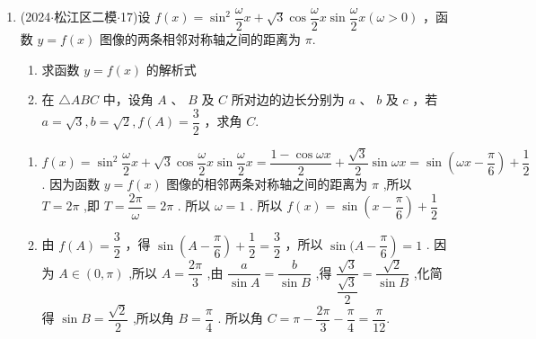 \begin{enumerate}
    \item (2024$\cdot$松江区二模$\cdot$17)设 $f\left( x\right)  = {\sin }^{2}\dfrac{\omega }{2}x + \sqrt{3}\cos \dfrac{\omega }{2}x\sin \dfrac{\omega }{2}x\left( {\omega  > 0}\right)$ ，函数 $y = f\left( x\right)$ 图像的两条相邻对称轴之间的距离为 $\pi$.
    \begin{enumerate}
        \item 求函数 $y = f\left( x\right)$ 的解析式
        \item 在 $\bigtriangleup  {ABC}$ 中，设角 $A$ 、 $B$ 及 $C$ 所对边的边长分别为 $a$ 、 $b$ 及 $c$ ，若 $a = \sqrt{3},b = \sqrt{2},f\left( A\right)  = \dfrac{3}{2}$ ，求角 $C$.
    \end{enumerate}
    \begin{jieda}
        \begin{enumerate}
            \item $f\left( x\right)  = {\sin }^{2}\dfrac{\omega }{2}x + \sqrt{3}\cos \dfrac{\omega }{2}x\sin \dfrac{\omega }{2}x = \dfrac{1 - \cos {\omega x}}{2} +  \dfrac{\sqrt{3}}{2}\sin {\omega x} = \sin \left( {{\omega x} - \dfrac{\pi }{6}}\right)  + \dfrac{1}{2}$ . 因为函数 $y = f\left( x\right)$ 图像的相邻两条对称轴之间的距离为 $\pi$ ,所以 $T = {2\pi }$ ,即 $T = \dfrac{2\pi }{\omega } = {2\pi }$ . 所以 $\omega  = 1$ . 所以 $f\left( x\right)  = \sin \left( {x - \dfrac{\pi }{6}}\right)  + \dfrac{1}{2}$
            \item 由 $f\left( A\right)  = \dfrac{3}{2}$ ，得 $\sin \left( {A - \dfrac{\pi }{6}}\right)  + \dfrac{1}{2} = \dfrac{3}{2}$ ，所以 $\sin (A -  \left. \dfrac{\pi }{6}\right)  = 1$ . 因为 $A \in  \left( {0,\pi }\right)$ ,所以 $A = \dfrac{2\pi }{3}$ ,由 $\dfrac{a}{\sin A} = \dfrac{b}{\sin B}$ ,得 $\dfrac{\sqrt{3}}{\dfrac{\sqrt{3}}{2}} =  \dfrac{\sqrt{2}}{\sin B}$ ,化简得 $\sin B = \dfrac{\sqrt{2}}{2}$ ,所以角 $B = \dfrac{\pi }{4}$ . 所以角 $C = \pi  - \dfrac{2\pi }{3}  - \dfrac{\pi }{4} = \dfrac{\pi }{12}.$
        \end{enumerate}
    \end{jieda}
    

\end{enumerate}
